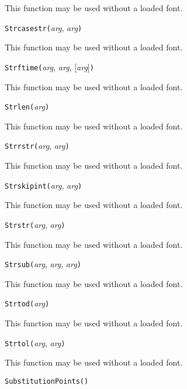 This function may be used without a loaded font.


\noindent\texttt{Strcasestr(}\textit{arg}, \textit{arg}\texttt{)}

This function may be used without a loaded font.


\noindent\texttt{Strftime(}\textit{arg}, \textit{arg}, [\textit{arg}]\texttt{)}

This function may be used without a loaded font.


\noindent\texttt{Strlen(}\textit{arg}\texttt{)}

This function may be used without a loaded font.


\noindent\texttt{Strrstr(}\textit{arg}, \textit{arg}\texttt{)}

This function may be used without a loaded font.


\noindent\texttt{Strskipint(}\textit{arg}, \textit{arg}\texttt{)}

This function may be used without a loaded font.


\noindent\texttt{Strstr(}\textit{arg}, \textit{arg}\texttt{)}

This function may be used without a loaded font.


\noindent\texttt{Strsub(}\textit{arg}, \textit{arg}, \textit{arg}\texttt{)}

This function may be used without a loaded font.


\noindent\texttt{Strtod(}\textit{arg}\texttt{)}

This function may be used without a loaded font.


\noindent\texttt{Strtol(}\textit{arg}, \textit{arg}\texttt{)}

This function may be used without a loaded font.


\noindent\texttt{SubstitutionPoints(}\texttt{)}


